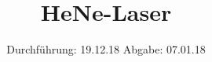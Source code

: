 

\subject{V61}
\title{HeNe-Laser}
\date{%
  Durchführung: 19.12.18
  \hspace{3em}
  Abgabe: 07.01.18
}



\maketitle
\thispagestyle{empty}
\tableofcontents
\newpage









\printbibliography{}


